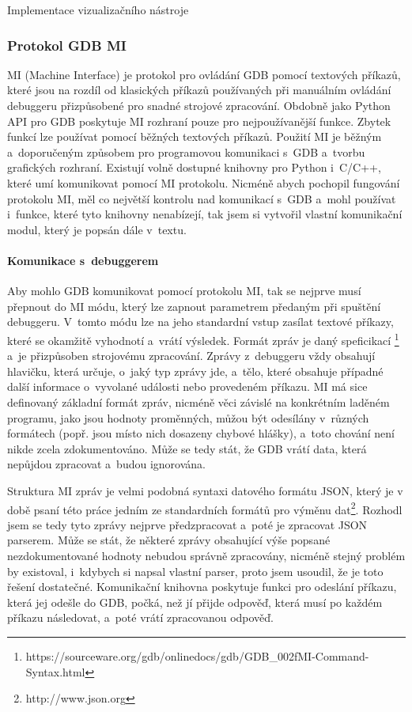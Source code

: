 \documentclass[czech,bachelor,male,python,dept460,hidelinks]{diploma}						%
\newcommand{\parspace}[1][]{
	\ifthenelse{\isempty{#1}}{\vspace{0mm}}{\vspace{#1}}
	\par
}
\begin{document}
\begin{section}{Implementace vizualizačního nástroje}
		\subsubsection{Protokol GDB MI}
		MI (Machine Interface) je protokol pro ovládání GDB pomocí textových příkazů, které jsou na rozdíl od klasických příkazů používaných při manuálním
		ovládání debuggeru přizpůsobené pro snadné strojové zpracování. Obdobně jako Python API pro GDB poskytuje MI rozhraní pouze pro nejpoužívanější funkce.
		Zbytek funkcí lze používat pomocí běžných textových příkazů. Použití MI je běžným a~doporučeným \cite{gdb-mi-usage} způsobem pro programovou komunikaci
		s~GDB a~tvorbu grafických rozhraní. Existují volně dostupné knihovny pro Python i~C/C++, které umí komunikovat pomocí MI protokolu.
		Nicméně abych pochopil fungování protokolu MI, měl co největší kontrolu nad komunikací s~GDB a~mohl používat i~funkce, které tyto knihovny nenabízejí, tak
		jsem si vytvořil vlastní komunikační modul, který je popsán dále v~textu.
		
		\paragraph*{Komunikace s~debuggerem}
			Aby mohlo GDB komunikovat pomocí protokolu MI, tak se nejprve musí přepnout do MI módu, který lze zapnout parametrem předaným při spuštění debuggeru.
			V~tomto módu lze na jeho standardní vstup zasílat textové příkazy, které se okamžitě vyhodnotí a~vrátí výsledek. Formát zpráv je daný speficikací
			\footnote{https://sourceware.org/gdb/onlinedocs/gdb/GDB\_002fMI-Command-Syntax.html} a~je přizpůsoben strojovému zpracování. Zprávy z~debuggeru
			vždy obsahují hlavičku, která určuje, o~jaký typ zprávy jde, a~tělo, které obsahuje případné další informace o~vyvolané události nebo
			provedeném příkazu. MI má sice definovaný základní formát zpráv, nicméně věci závislé na konkrétním laděném programu, jako jsou hodnoty proměnných,
			můžou být odesílány v~různých formátech (popř. jsou místo nich dosazeny chybové hlášky), a~toto chování není nikde zcela zdokumentováno.
			Může se tedy stát, že GDB vrátí data, která nepůjdou zpracovat a~budou ignorována.
			
			\parspace Struktura MI zpráv je velmi podobná syntaxi datového formátu JSON, který je v době psaní této práce jedním ze standardních formátů pro výměnu
			dat\footnote{http://www.json.org}.
			Rozhodl jsem se tedy tyto zprávy nejprve předzpracovat a~poté je zpracovat JSON parserem. Může se stát, že některé zprávy obsahující výše popsané 
			nezdokumentované hodnoty nebudou správně zpracovány, nicméně stejný problém by existoval, i~kdybych si napsal vlastní parser, proto jsem usoudil, že je
			toto řešení dostatečné. Komunikační knihovna poskytuje funkci pro odeslání příkazu, která jej odešle do GDB, počká, než jí přijde odpověď, která musí po
			každém příkazu následovat, a~poté vrátí zpracovanou odpověď.
			

\end{section}
\end{document}
